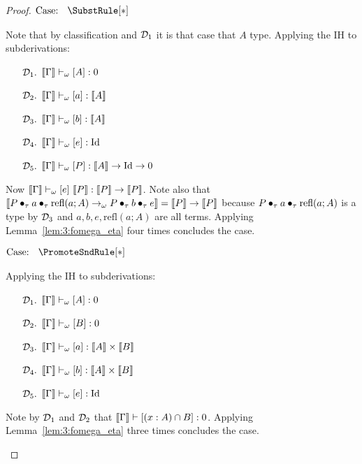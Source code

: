 \begin{proof}
    $\text{Case: }\begin{array}{c} \SubstRule[*] \end{array}$
    \begin{proofcase}
        Note that by classification and $\mathcal{D}_{1}$ it is that case that $A$ type.
        Applying the IH to subderivations:
        \begin{enumerate}
            \item[$\mathcal{D}_{1}.$] $\llbracket \Gamma \rrbracket \vdash_\omega [A] : 0$
            \item[$\mathcal{D}_{2}.$] $\llbracket \Gamma \rrbracket \vdash_\omega [a] : \llbracket A \rrbracket$
            \item[$\mathcal{D}_{3}.$] $\llbracket \Gamma \rrbracket \vdash_\omega [b] : \llbracket A \rrbracket$ 
            \item[$\mathcal{D}_{4}.$] $\llbracket \Gamma \rrbracket \vdash_\omega [e] : \text{Id}$
            \item[$\mathcal{D}_{5}.$] $\llbracket \Gamma \rrbracket \vdash_\omega [P] : \llbracket A \rrbracket \to \text{Id} \to 0$
        \end{enumerate}
        Now $\sema{\Gamma} \vdash_\omega [e]\ \sema{P} : \sema{P} \to \sema{P}$.
        Note also that $\llbracket P \bullet_{\tau} a \bullet_{\tau} \text{refl}(a;A) \to_\omega P \bullet_{\tau} b \bullet_{\tau} e \rrbracket = \llbracket P \rrbracket \to \llbracket P \rrbracket$ because $P \bullet_{\tau} a \bullet_{\tau} \text{refl}(a;A)$ is a type by $\mathcal{D}_{3}$ and $a, b, e, \text{refl}(a;A)$ are all terms.
        Applying Lemma~\ref{lem:3:fomega_eta} four times concludes the case.
    \end{proofcase}

    $\text{Case: }\begin{array}{c} \PromoteSndRule[*] \end{array}$
    \begin{proofcase}
        Applying the IH to subderivations:
        \begin{enumerate}
            \item[$\mathcal{D}_{1}.$] $\llbracket \Gamma \rrbracket \vdash_\omega [A] : 0$
            \item[$\mathcal{D}_{2}.$] $\llbracket \Gamma \rrbracket \vdash_\omega [B] : 0$
            \item[$\mathcal{D}_{3}.$] $\llbracket \Gamma \rrbracket \vdash_\omega [a] : \llbracket A \rrbracket \times \llbracket B \rrbracket$
            \item[$\mathcal{D}_{4}.$] $\llbracket \Gamma \rrbracket \vdash_\omega [b] : \llbracket A \rrbracket \times \llbracket B \rrbracket$
            \item[$\mathcal{D}_{5}.$] $\llbracket \Gamma \rrbracket \vdash_\omega [e] : \text{Id}$
        \end{enumerate}
        Note by $\mathcal{D}_{1}$ and $\mathcal{D}_{2}$ that $\llbracket \Gamma \rrbracket \vdash [(x : A) \cap B] : 0$.
        Applying Lemma~\ref{lem:3:fomega_eta} three times concludes the case.
    \end{proofcase}


\end{proof}
